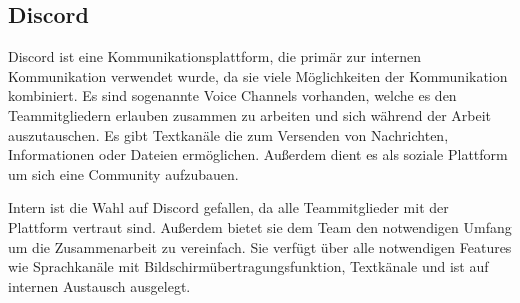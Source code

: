 \subsection{Discord}\label{subsec:Discord}
Discord ist eine Kommunikationsplattform, die primär zur internen Kommunikation verwendet wurde, da sie viele Möglichkeiten der Kommunikation kombiniert.
Es sind sogenannte Voice Channels vorhanden, welche es den Teammitgliedern erlauben zusammen zu arbeiten und sich während der Arbeit auszutauschen.
Es gibt Textkanäle die zum Versenden von Nachrichten, Informationen oder Dateien ermöglichen. Außerdem dient es als soziale Plattform um sich eine Community aufzubauen.\cite[vgl.]{Discord}

Intern ist die Wahl auf Discord gefallen, da alle Teammitglieder mit der Plattform vertraut sind. Außerdem bietet sie dem Team den notwendigen Umfang um die Zusammenarbeit zu vereinfach.
Sie verfügt über alle notwendigen Features wie Sprachkanäle mit Bildschirmübertragungsfunktion, Textkänale und ist auf internen Austausch ausgelegt.

%

\renewcommand{\kapitelautor}{}
